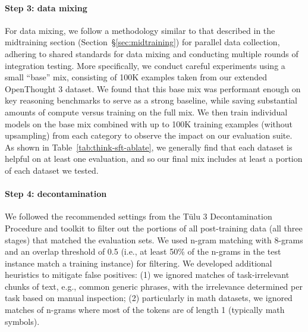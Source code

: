 \documentclass[table]{ai2style/ai2}
\begin{document}
\paragraph{Step 3: data mixing}
For data mixing, we follow a methodology similar to that described in the midtraining section (Section~\S\ref{sec:midtraining}) for parallel data collection, adhering to shared standards for data mixing and conducting multiple rounds of integration testing.
More specifically, we conduct careful experiments using a small ``base'' mix, consisting of 100K examples taken from our extended OpenThought 3 dataset.
We found that this base mix was performant enough on key reasoning benchmarks to serve as a strong baseline, while saving substantial amounts of compute versus training on the full mix.
We then train individual models on the base mix combined with up to 100K training examples (without upsampling) from each category to observe the impact on our evaluation suite.
As shown in Table~\ref{tab:think-sft-ablate}, we generally find that each dataset is helpful on at least one evaluation, and so our final mix includes at least a portion of each dataset we tested.

\paragraph{Step 4: decontamination} We followed the recommended settings from the T\"ulu 3 Decontamination Procedure and toolkit \citep{lambert2024tulu3} to filter out the portions of all post-training data (all three stages) that matched the evaluation sets. We used n-gram matching with 8-grams and an overlap threshold of 0.5 (i.e., at least 50\% of the n-grams in the test instance match a training instance) for filtering. We developed additional heuristics to mitigate false positives: (1) we ignored matches of task-irrelevant chunks of text, e.g., common generic phrases, with the irrelevance determined per task based on manual inspection; (2) particularly in math datasets, we ignored matches of n-grams where most of the tokens are of length 1 (typically math symbols). 
\end{document}
